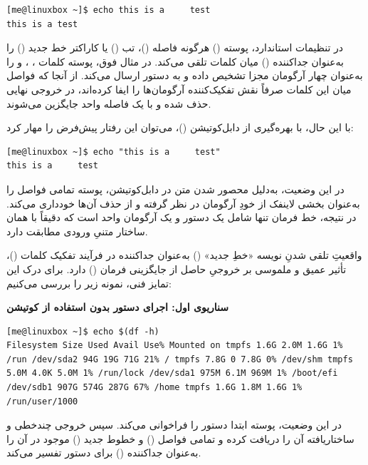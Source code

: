 \begin{latin}
\begin{lstlisting}
[me@linuxbox ~]$ echo this is a     test
this is a test
\end{lstlisting}
\end{latin}

در تنظیمات استاندارد، پوسته () هرگونه فاصله ()، تب () یا کاراکتر خط جدید () را به‌عنوان جداکننده () میان کلمات تلقی می‌کند. در مثال فوق، پوسته کلمات ، ،  و  را به‌عنوان چهار آرگومان مجزا تشخیص داده و به دستور  ارسال می‌کند. از آنجا که فواصل میان این کلمات صرفاً نقش تفکیک‌کننده آرگومان‌ها را ایفا کرده‌اند، در خروجی نهایی حذف شده و با یک فاصله واحد جایگزین می‌شوند.

با این حال، با بهره‌گیری از دابل‌کوتیشن ()، می‌توان این رفتار پیش‌فرض را مهار کرد:

\begin{latin}
\begin{lstlisting}
[me@linuxbox ~]$ echo "this is a     test"
this is a     test
\end{lstlisting}
\end{latin}

در این وضعیت، به‌دلیل محصور شدن متن در دابل‌کوتیشن، پوسته تمامی فواصل را به‌عنوان بخشی لاینفک از خودِ آرگومان در نظر گرفته و از حذف آن‌ها خودداری می‌کند. در نتیجه، خط فرمان تنها شامل یک دستور و یک آرگومان واحد است که دقیقاً با همان ساختار متنیِ ورودی مطابقت دارد.

واقعیتِ تلقی شدنِ نویسه «خطِ جدید» () به‌عنوان جداکننده در فرآیند تفکیک کلمات ()، تأثیر عمیق و ملموسی بر خروجیِ حاصل از جایگزینی فرمان () دارد. برای درک این تمایز فنی، نمونه زیر را بررسی می‌کنیم:

\textbf{سناریوی اول: اجرای دستور بدون استفاده از کوتیشن}

\begin{latin}
\begin{lstlisting}
[me@linuxbox ~]$ echo $(df -h)
Filesystem Size Used Avail Use% Mounted on tmpfs 1.6G 2.0M 1.6G 1% /run /dev/sda2 94G 19G 71G 21% / tmpfs 7.8G 0 7.8G 0% /dev/shm tmpfs 5.0M 4.0K 5.0M 1% /run/lock /dev/sda1 975M 6.1M 969M 1% /boot/efi /dev/sdb1 907G 574G 287G 67% /home tmpfs 1.6G 1.8M 1.6G 1% /run/user/1000
\end{lstlisting}
\end{latin}

در این وضعیت، پوسته ابتدا دستور  را فراخوانی می‌کند. سپس خروجی چندخطی و ساختاریافته آن را دریافت کرده و تمامی فواصل () و خطوط جدید () موجود در آن را به‌عنوان جداکننده () برای دستور  تفسیر می‌کند.

